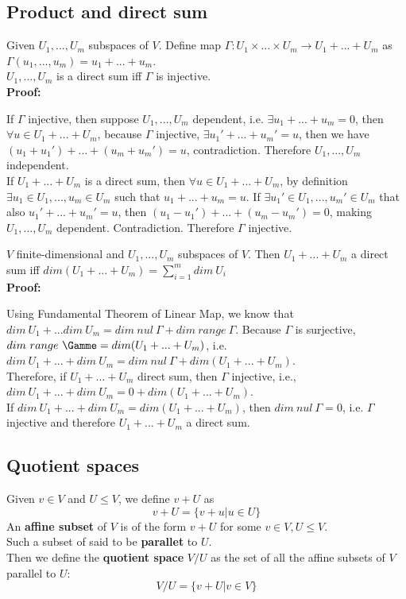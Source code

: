 \documentclass{article}
\begin{document}
\subsection{Product and direct sum}
Given $U_1, ..., U_m$ subspaces of $V$. Define map $\Gamma: U_1 \times ... \times U_m \rightarrow U_1 + ... + U_m$ as $\Gamma(u_1, ..., u_m) = u_1 + ... + u_m$.\\
$U_1, ..., U_m$ is a direct sum iff $\Gamma$ is injective.\\
\textbf{Proof:}
\begin{addmargin}[1em]{0em}
If $\Gamma$ injective, then suppose $U_1, ..., U_m$ dependent, i.e. $\exists u_1+ ... + u_m = 0$, then $\forall u \in U_1 + ... + U_m$, because $\Gamma$ injective, $\exists u_1' + ... + u_m' = u$, then we have $(u_1 + u_1') + ... + (u_m + u_m') = u$, contradiction. Therefore $U_1, ..., U_m$ independent.\\
If $U_1 + ... + U_m$ is a direct sum, then $\forall u \in U_1 + ... + U_m$, by definition $\exists u_1 \in U_1, ..., u_m \in U_m$ such that $u_1 + ... + u_m = u$. If $\exists u_1' \in U_1, ..., u_m' \in U_m$ that also $u_1' + ... + u_m' = u$, then $(u_1 - u_1') + ... + (u_m - u_m') = 0$, making $U_1, ..., U_m$ dependent. Contradiction. Therefore $\Gamma$ injective.\\
\end{addmargin}
$V$ finite-dimensional and $U_1, ..., U_m$ subspaces of $V$. Then $U_1 + ... + U_m$ a direct sum iff $dim(U_1 + ... + U_m) = \sum_{i=1}^{m} dim\ U_i$\\
\textbf{Proof:}
\begin{addmargin}[1em]{0em}
Using Fundamental Theorem of Linear Map, we know that $dim\ U_1 + ... dim\ U_m = dim\ nul\ \Gamma + dim\ range\ \Gamma$. Because $\Gamma$ is surjective, $dim\ range\ \Gamme = dim(U_1 + ... + U_m)$, i.e. $dim\ U_1 + ... + dim\ U_m = dim\ nul\ \Gamma + dim(U_1 + ... + U_m)$.\\
Therefore, if $U_1 + ... + U_m$ direct sum, then $\Gamma$ injective, i.e., $dim\ U_1 + ... + dim\ U_m = 0 + dim(U_1 + ... + U_m)$.\\
If $dim\ U_1 + ... + dim\ U_m = dim(U_1 + ... + U_m)$, then $dim\ nul\ \Gamma = 0$, i.e. $\Gamma$ injective and therefore $U_1 + ... + U_m$ a direct sum.
\end{addmargin}
\subsection{Quotient spaces}
Given $v \in V$ and $U \leq V$, we define $v+U$ as
\begin{equation*}
    v + U = \{v+u|u \in U\}
\end{equation*}
An \textbf{affine subset} of $V$ is of the form $v + U$ for some $v \in V, U \leq V$.\\
Such a subset of said to be \textbf{parallet} to $U$.\\
Then we define the \textbf{quotient space} $V/U$ as the set of all the affine subsets of $V$ parallel to $U$:
\begin{equation*}
    V/U = \{v + U | v \in V\}
\end{equation*}
\end{document}
